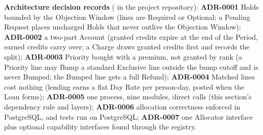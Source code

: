 \textbf{Architecture decision records} ( in the project repository):
\label{adr:0001}\textbf{ADR-0001} Holds bounded by the Objection Window (lines are Required or Optional; a Pending Request places uncharged Holds that never outlive the Objection Window);
\label{adr:0002}\textbf{ADR-0002} a two-part Account (granted credits expire at the end of the Period, earned credits carry over; a Charge draws granted credits first and records the split);
\label{adr:0003}\textbf{ADR-0003} Priority bought with a premium, not granted by rank (a Priority line may Bump a standard Exclusive line outside the bump cutoff and is never Bumped; the Bumped line gets a full Refund);
\label{adr:0004}\textbf{ADR-0004} Matched lines cost nothing (lending earns a flat Day Rate per person-day, posted when the Loan forms);
\label{adr:0005}\textbf{ADR-0005} one process, nine modules, direct calls (this section's dependency rule and layers);
\label{adr:0006}\textbf{ADR-0006} allocation correctness enforced in PostgreSQL, and tests run on PostgreSQL;
\label{adr:0007}\textbf{ADR-0007} one Allocator interface plus optional capability interfaces found through the registry.
